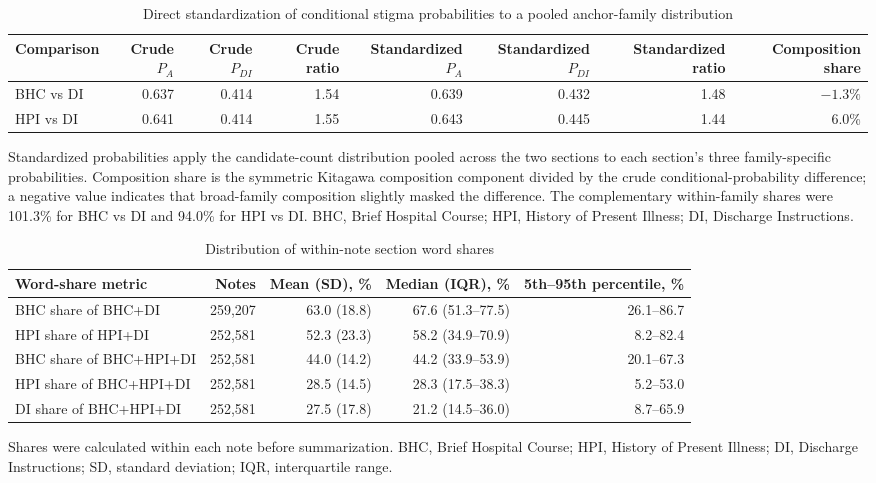 \documentclass[unnumsec,webpdf,contemporary,large]{oup-authoring-template}
\begin{document}
\begin{table}[H]
\caption{Direct standardization of conditional stigma probabilities to a pooled anchor-family distribution}
\label{tab:s_family_standardization}
\centering
\small
\begin{tabular}{lrrrrrrr}
\toprule
Comparison & Crude $P_A$ & Crude $P_{DI}$ & Crude ratio & Standardized $P_A$ & Standardized $P_{DI}$ & Standardized ratio & Composition share \\
\midrule
BHC vs DI & 0.637 & 0.414 & 1.54 & 0.639 & 0.432 & 1.48 & $-1.3\%$ \\
HPI vs DI & 0.641 & 0.414 & 1.55 & 0.643 & 0.445 & 1.44 & 6.0\% \\
\bottomrule
\end{tabular}
\begin{tablenotes}
\item Standardized probabilities apply the candidate-count distribution pooled across the two sections to each section's three family-specific probabilities. Composition share is the symmetric Kitagawa composition component divided by the crude conditional-probability difference; a negative value indicates that broad-family composition slightly masked the difference. The complementary within-family shares were 101.3\% for BHC vs DI and 94.0\% for HPI vs DI. BHC, Brief Hospital Course; HPI, History of Present Illness; DI, Discharge Instructions.
\end{tablenotes}
\end{table}

\begin{table}[H]
\caption{Distribution of within-note section word shares}
\label{tab:s_section_shares}
\centering
\small
\begin{tabular}{lrrrr}
\toprule
Word-share metric & Notes & Mean (SD), \% & Median (IQR), \% & 5th--95th percentile, \% \\
\midrule
BHC share of BHC+DI & 259,207 & 63.0 (18.8) & 67.6 (51.3--77.5) & 26.1--86.7 \\
HPI share of HPI+DI & 252,581 & 52.3 (23.3) & 58.2 (34.9--70.9) & 8.2--82.4 \\
BHC share of BHC+HPI+DI & 252,581 & 44.0 (14.2) & 44.2 (33.9--53.9) & 20.1--67.3 \\
HPI share of BHC+HPI+DI & 252,581 & 28.5 (14.5) & 28.3 (17.5--38.3) & 5.2--53.0 \\
DI share of BHC+HPI+DI & 252,581 & 27.5 (17.8) & 21.2 (14.5--36.0) & 8.7--65.9 \\
\bottomrule
\end{tabular}
\begin{tablenotes}
\item Shares were calculated within each note before summarization. BHC, Brief Hospital Course; HPI, History of Present Illness; DI, Discharge Instructions; SD, standard deviation; IQR, interquartile range.
\end{tablenotes}
\end{table}
\end{document}

